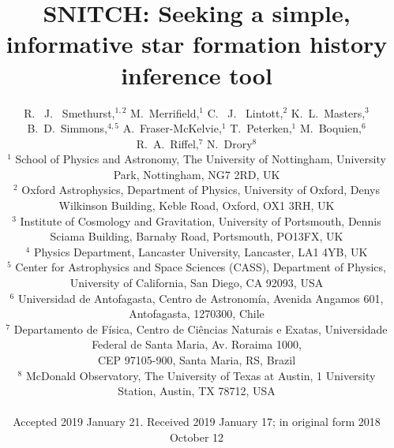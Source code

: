 \documentclass[useAMS,usenatbib]{mn2e}
\begin{document}
\title[\textsc{snitch}: inferring informative  SFHs]{SNITCH: Seeking a simple, informative star formation history inference tool}
\author[Smethurst et al. 2018]{R. ~J. ~Smethurst,$^{1,2}$ M.~Merrifield,$^{1}$ C. ~J. ~Lintott,$^{2}$ K.~L.~Masters,$^{3}$ B.~D.~Simmons,$^{4,5}$ \newauthor A.~Fraser-McKelvie,$^{1}$ T.~Peterken,$^{1}$ M.~Boquien,$^{6}$ R.~A.~Riffel,$^{7}$ N.~Drory$^{8}$
\\ $^1$ School of Physics and Astronomy, The University of Nottingham, University Park, Nottingham, NG7 2RD, UK
\\ $^2$ Oxford Astrophysics, Department of Physics, University of Oxford, Denys Wilkinson Building, Keble Road, Oxford, OX1 3RH, UK
\\ $^3$ Institute of Cosmology and Gravitation, 
University of Portsmouth, Dennis Sciama Building, Barnaby Road, Portsmouth, PO13FX, UK
\\ $^4$ Physics Department, Lancaster University, Lancaster, LA1 4YB, UK
\\ $^5$ Center for Astrophysics and Space Sciences (CASS), Department of Physics, University of California, San Diego, CA 92093, USA
\\ $^6$ Universidad de Antofagasta, Centro de Astronom\'ia, Avenida Angamos 601, Antofagasta, 1270300, Chile
\\ $^7$ Departamento de Física, Centro de Ciências Naturais e Exatas,  Universidade Federal de Santa Maria, Av. Roraima 1000,\\ CEP 97105-900, Santa Maria, RS, Brazil 
\\ $^8$ McDonald Observatory, The University of Texas at Austin, 1 University Station, Austin, TX 78712, USA
\\
\\Accepted 2019 January 21. Received 2019 January 17; in original form 2018 October 12
}

\maketitle
\end{document}
